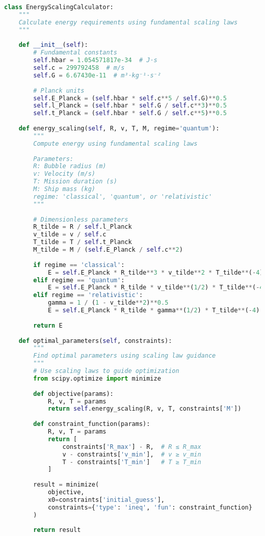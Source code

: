 \documentclass[12pt,a4paper]{article}
\begin{document}
\begin{lstlisting}[language=Python]
class EnergyScalingCalculator:
    """
    Calculate energy requirements using fundamental scaling laws
    """
    
    def __init__(self):
        # Fundamental constants
        self.hbar = 1.054571817e-34  # J⋅s
        self.c = 299792458  # m/s
        self.G = 6.67430e-11  # m³⋅kg⁻¹⋅s⁻²
        
        # Planck units
        self.E_Planck = (self.hbar * self.c**5 / self.G)**0.5
        self.l_Planck = (self.hbar * self.G / self.c**3)**0.5
        self.t_Planck = (self.hbar * self.G / self.c**5)**0.5
        
    def energy_scaling(self, R, v, T, M, regime='quantum'):
        """
        Compute energy using fundamental scaling laws
        
        Parameters:
        R: Bubble radius (m)
        v: Velocity (m/s)
        T: Mission duration (s)
        M: Ship mass (kg)
        regime: 'classical', 'quantum', or 'relativistic'
        """
        
        # Dimensionless parameters
        R_tilde = R / self.l_Planck
        v_tilde = v / self.c
        T_tilde = T / self.t_Planck
        M_tilde = M / (self.E_Planck / self.c**2)
        
        if regime == 'classical':
            E = self.E_Planck * R_tilde**3 * v_tilde**2 * T_tilde**(-4)
        elif regime == 'quantum':
            E = self.E_Planck * R_tilde * v_tilde**(1/2) * T_tilde**(-4)
        elif regime == 'relativistic':
            gamma = 1 / (1 - v_tilde**2)**0.5
            E = self.E_Planck * R_tilde * gamma**(1/2) * T_tilde**(-4)
        
        return E
    
    def optimal_parameters(self, constraints):
        """
        Find optimal parameters using scaling law guidance
        """
        # Use scaling laws to guide optimization
        from scipy.optimize import minimize
        
        def objective(params):
            R, v, T = params
            return self.energy_scaling(R, v, T, constraints['M'])
        
        def constraint_function(params):
            R, v, T = params
            return [
                constraints['R_max'] - R,  # R ≤ R_max
                v - constraints['v_min'],  # v ≥ v_min
                T - constraints['T_min']   # T ≥ T_min
            ]
        
        result = minimize(
            objective,
            x0=constraints['initial_guess'],
            constraints={'type': 'ineq', 'fun': constraint_function}
        )
        
        return result
\end{lstlisting}
\end{document}
